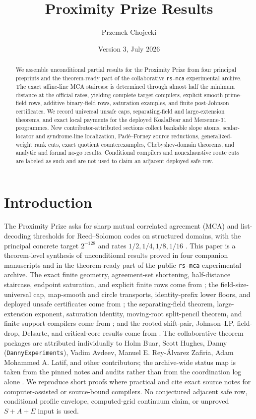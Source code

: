 \documentclass[11pt,a4paper]{amsart}
\title{Proximity Prize Results}
\author{Przemek Chojecki}
\date{Version 3, July 2026}
\numberwithin{equation}{section}
\theoremstyle{remark}
\begin{document}
\raggedbottom

\begin{abstract}
We assemble unconditional partial results for the Proximity Prize from four principal preprints and the theorem-ready part of the collaborative \texttt{rs-mca} experimental archive.  The exact affine-line MCA staircase is determined through almost half the minimum distance at the official rates, yielding complete target compilers, explicit smooth prime-field rows, additive binary-field rows, saturation examples, and finite post-Johnson certificates.  We record universal unsafe caps, separating-field and large-extension theorems, and exact local payments for the deployed KoalaBear and Mersenne-31 programmes.  New contributor-attributed sections collect bankable slope atoms, scalar-locator and syndrome-line localization, Pad\'e--Forney source reductions, generalized-weight rank cuts, exact quotient counterexamples, Chebyshev-domain theorems, and analytic and formal no-go results.  Conditional compilers and nonexhaustive route cuts are labeled as such and are not used to claim an adjacent deployed safe row.
\end{abstract}

\maketitle

\section{Introduction}

The Proximity Prize asks for sharp mutual correlated agreement (MCA) and list-decoding thresholds for Reed--Solomon codes on structured domains, with the principal concrete target $2^{-128}$ and rates $1/2,1/4,1/8,1/16$ \cite{ProximityPrize,ABF26}.  This paper is a theorem-level synthesis of unconditional results proved in four companion manuscripts and in the theorem-ready part of the public \texttt{rs-mca} experimental archive.  The exact finite geometry, agreement-set shortening, half-distance staircase, endpoint saturation, and explicit finite rows come from \cite{ChoShort26}; the field-size-universal cap, map-smooth and circle transports, identity-prefix lower floors, and deployed unsafe certificates come from \cite{ChoCap26}; the separating-field theorem, large-extension exponent, saturation identity, moving-root split-pencil theorem, and finite support compilers come from \cite{ChoGF26}; and the rooted shift-pair, Johnson--LP, field-drop, Delsarte, and critical-core results come from \cite{ChoComp26}.  The collaborative theorem packages are attributed individually to Holm Buar, Scott Hughes, Danny (\texttt{DannyExperiments}), Vadim Avdeev, Manuel E. Rey-\'Alvarez Zafiria, Adam Mohammed A. Latif, and other contributors; the archive-wide status map is taken from the pinned notes and audits rather than from the coordination log alone \cite{RepoLog26,PRReport26}.  We reproduce short proofs where practical and cite exact source notes for computer-assisted or source-bound compilers.  No conjectured adjacent safe row, conditional profile envelope, computed-grid continuum claim, or unproved $S{+}A{+}E$ input is used.
\end{document}
